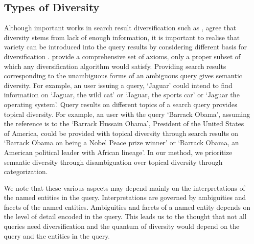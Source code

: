 \documentclass[11pt]{article}
\begin{document}
\subsection{Types of Diversity}
\label{types}
Although important works in search result diversification such as \cite{agrawal2009diversifying}, 
\cite{santos2010explicit} agree that diversity stems from lack of enough information, 
it is important to realise that variety can be introduced into the query results by 
considering different basis for diversification . \cite{gollapudi2009axiomatic} provide a 
comprehensive set of axioms, only a proper subset of which any diversification algorithm 
would satisfy. Providing search results corresponding to the unambiguous forms of 
an ambiguous query gives semantic diversity. For example, an user issuing a query, 
`Jaguar' could intend to find information on `Jaguar, the wild cat' or `Jaguar, 
the sports car' or `Jaguar the operating system'. Query results on different topics 
of a search query provides topical diversity. For example, an user with the query 
`Barrack Obama', assuming the reference is to the `Barrack Hussain Obama', President 
of the United States of America, could be provided with topical diversity through 
search results on `Barrack Obama on being a Nobel Peace prize winner' or `Barrack 
Obama, an American political leader with African lineage'. In our method, we prioritize 
semantic diversity through disambiguation over topical diversity through categorization.

We note that these various aspects may depend mainly on the interpretations of the 
named entities in the query. Interpretations are governed by ambiguities and 
facets of the named entities. Ambiguities and facets of a named entity depends on 
the level of detail encoded in the query. This leads us to the thought that not 
all queries need diversification and the quantum of diversity would depend on the 
query and the entities in the query.
 
\end{document}
